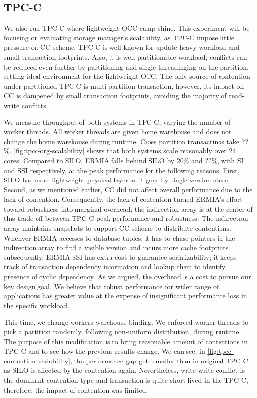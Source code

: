 \subsection{TPC-C} 
We also run TPC-C where lightweight OCC camp shine. This experiment will be focusing on evaluating storage manager's scalability, as TPC-C impose little pressure on CC scheme. TPC-C is well-known for update-heavy workload and small transaction footprints. Also, it is well-partitionable workload; conflicts can be reduced even further by partitioning and single-threadinging on the partition, setting ideal environment for the lightweight OCC. The only source of contention under partitioned TPC-C is multi-partition transaction, however, its impact on CC is dampened by small transaction footprints, avoiding the majority of read-write conflicts. %

We measure throughput of both systems in TPC-C, varying the number of worker threads. All worker threads are given home warehouse and does not change the home warehouse during runtime. Cross partition transactinos take ??\%. \ref{fig:tpcc-org-scalability} shows that both systems scale reasonably over 24 cores. Compared to SILO, ERMIA falls behind SILO by 20\% and ??\%, with SI and SSI respectively, at the peak performance for the following reasons. First, SILO has more lightweight physical layer as it goes by single-version store. Second, as we mentioned earlier, CC did not affect overall performance due to the lack of contention. Consequently, the lack of contention turned ERMIA's effort toward robustness into marginal overhead; the indirection array is at the center of this trade-off between TPC-C peak performance and robustness. The indirection array maintains snapshots to support CC scheme to distribute contentions. Whenver ERMIA accesses to database tuples, it has to chase pointers in the indirection array to find a visible version and incurs more cache footprints subsequently. ERMIA-SSI has extra cost to guarantee serializability; it keeps track of transaction dependency information and lookup them to identify presence of cyclic dependency. As we argued, the overhead is a cost to pursue our key design goal. We believe that robust performance for wider range of applications has greater value at the expense of insignificant performance loss in the specific workload.

This time, we change workers-warehouse binding. We enforced worker threads to pick a partition randomly, following non-uniform distribution, during runtime. The purpose of this modification is to bring reasonable amount of contentions in TPC-C and to see how the previous results change. We can see, in \ref{fig:tpcc-contention-scalability}, the performance gap gets smaller than in original TPC-C as SILO is affected by the contention again. Nevertheless, write-write conflict is the dominant contention type and transaction is quite short-lived in the TPC-C, therefore, the impact of contention was limited.  %

